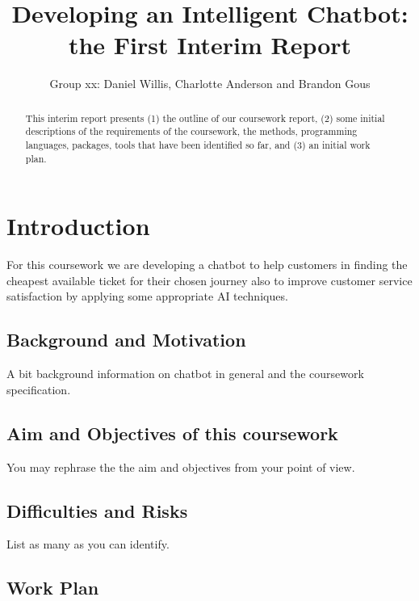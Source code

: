 \documentclass[11pt]{article}
\title{Developing an Intelligent Chatbot: the First Interim Report}
\author{Group xx: Daniel Willis, Charlotte Anderson and Brandon Gous}
\begin{document}
	
	\maketitle	
	\begin{abstract}
		This interim report presents (1) the outline of our coursework report, (2) some initial descriptions of the requirements of the coursework, the methods, programming languages, packages, tools that have been identified so far, and (3) an initial work plan.
	\end{abstract}
	
	\section{Introduction}
	
	
	For this coursework we are developing a chatbot to help customers in finding the cheapest available ticket for their chosen journey also to improve customer service satisfaction by applying some appropriate AI techniques.
	
	\subsection{Background and Motivation}
	A bit background information on chatbot in general and the coursework specification\citep{AI2018CW}.
	
	\subsection{Aim and Objectives of this coursework} 
	You may rephrase the the aim and objectives from your point of view.  
	
	\subsection{Difficulties and Risks}
	
	List as many as you can identify. 
	
	\subsection{Work Plan}
	
\end{document}
